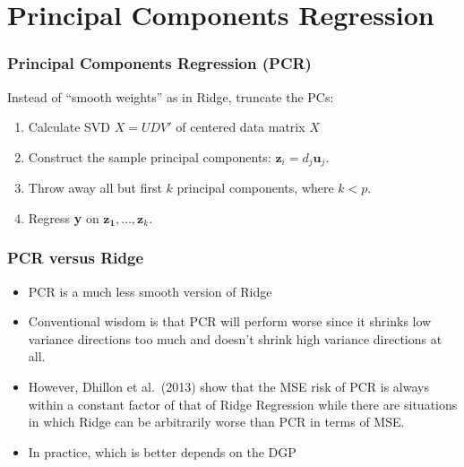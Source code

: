 \section{Principal Components Regression}
\begin{frame}
  \frametitle{Principal Components Regression (PCR)}

  \small

Instead of ``smooth weights'' as in Ridge, truncate the PCs:
	\begin{enumerate}
    \item Calculate SVD $X=UDV'$ of \alert{centered} data matrix $X$
		\item Construct the sample principal components: $\mathbf{z}_i = d_j \mathbf{u}_j$.
		\item Throw away all but first $k$ principal components, where $k <p$.
		\item Regress \textbf{y} on $\mathbf{z_1}, \hdots, \mathbf{z}_k$. 
	\end{enumerate}

\end{frame}
\begin{frame}
  \frametitle{PCR versus Ridge}
  \begin{itemize}
    \item PCR is a much less smooth version of Ridge
    \item Conventional wisdom is that PCR will perform worse since it shrinks low variance directions too much and doesn't shrink high variance directions at all.
  \item However, Dhillon et al.\ (2013) show that the MSE risk of PCR is always within a constant factor of that of Ridge Regression while there are situations in which Ridge can be arbitrarily worse than PCR in terms of MSE. 
    \item In practice, which is better depends on the DGP
  \end{itemize}
\end{frame}
